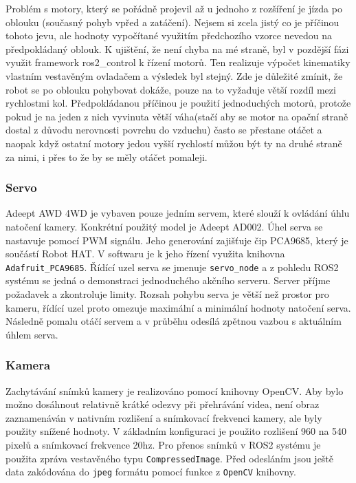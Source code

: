 Problém s motory, který se pořádně projevil až u jednoho z rozšíření je jízda po oblouku (současný pohyb vpřed a zatáčení). Nejsem si zcela jistý co je příčinou tohoto jevu, ale hodnoty vypočítané využitím předchozího vzorce nevedou na předpokládaný oblouk. K ujištění, že není chyba na mé straně, byl v pozdější fázi využit framework ros2\_control k řízení motorů. Ten realizuje výpočet kinematiky vlastním vestavěným ovladačem a výsledek byl stejný. Zde je důležité zmínit, že robot se po oblouku pohybovat dokáže, pouze na to vyžaduje větší rozdíl mezi rychlostmi kol. Předpokládanou příčinou je použití jednoduchých motorů, protože pokud je na jeden z nich vyvinuta větší váha(stačí aby se motor na opační straně dostal z důvodu nerovnosti povrchu do vzduchu) často se přestane otáčet a naopak když ostatní motory jedou vyšší rychlostí můžou být ty na druhé straně  za nimi, i přes to že by se měly otáčet pomaleji.

\subsubsection*{Servo}
Adeept AWD 4WD je vybaven pouze jedním servem, které slouží k ovládání úhlu natočení kamery. Konkrétní použitý model je Adeept AD002. Úhel serva se nastavuje pomocí PWM signálu. Jeho generování zajišťuje čip PCA9685, který je součástí Robot HAT. V softwaru je k jeho řízení využita knihovna \verb|Adafruit_PCA9685|. Řídící uzel serva se jmenuje \verb|servo_node| a z pohledu ROS2 systému se jedná o demonstraci jednoduchého akčního serveru. Server příjme požadavek a zkontroluje limity. 
Rozsah pohybu serva je větší než prostor pro kameru, řídící uzel proto omezuje maximální a minimální hodnoty natočení serva. Následně pomalu otáčí servem a v průběhu odesílá zpětnou vazbou s aktuálním úhlem serva.

\subsubsection*{Kamera} \label{implementation:camera}
Zachytávání snímků kamery je realizováno pomocí knihovny OpenCV. Aby bylo možno dosáhnout relativně krátké odezvy při přehrávání videa, není obraz zaznamenáván v nativním rozlišení a snímkovací frekvenci kamery, ale byly použity snížené hodnoty. V základním konfiguraci je použito rozlišení 960 na 540 pixelů a snímkovací frekvence 20hz.
Pro přenos snímků v ROS2 systému je použita zpráva vestavěného typu \verb|CompressedImage|. Před odesláním jsou ještě data zakódována do \verb|jpeg| formátu pomocí funkce z \verb|OpenCV| knihovny.

